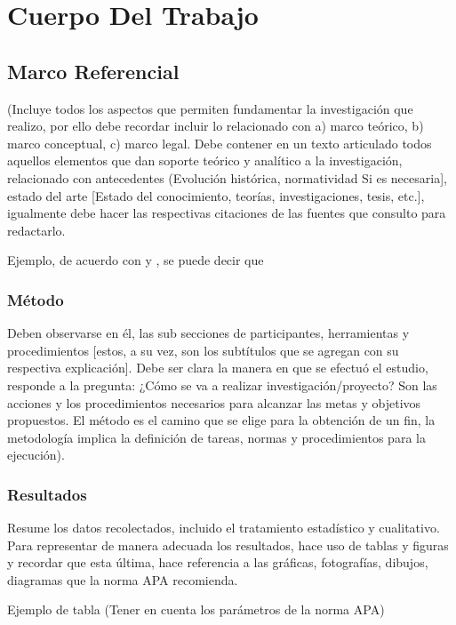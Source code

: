 \documentclass[11pt,openany]{book}
\begin{document}
\chapter{Cuerpo Del Trabajo}

\section{Marco Referencial}

(Incluye todos los aspectos que permiten fundamentar la investigación que realizo, por ello debe recordar incluir lo relacionado con a) marco teórico, b) marco conceptual, c) marco legal. Debe contener en un texto articulado todos aquellos elementos que dan soporte teórico y analítico a la investigación, relacionado con antecedentes (Evolución histórica, normatividad Si es necesaria], estado del arte [Estado del conocimiento, teorías, investigaciones, tesis, etc.], igualmente debe hacer las respectivas citaciones de las fuentes que consulto para redactarlo.

Ejemplo, de acuerdo con \parencite{Li2022} y \textcite{Vidas2021}, se puede decir que \lipsum[1]

\subsection{Método}

Deben observarse en él, las sub secciones de participantes, herramientas y procedimientos [estos, a su vez, son los subtítulos que se agregan con su respectiva explicación]. Debe ser clara la manera en que se efectuó el estudio, responde a la pregunta: ¿Cómo se va a realizar investigación/proyecto? Son las acciones y los procedimientos necesarios para alcanzar las metas y objetivos propuestos. El método es el camino que se elige para la obtención de un fin, la metodología implica la definición de tareas, normas y procedimientos para la ejecución).

\subsection{Resultados}

Resume los datos recolectados, incluido el tratamiento estadístico y cualitativo. Para representar de manera adecuada los resultados, hace uso de tablas y figuras y recordar que esta última, hace referencia a las gráficas, fotografías, dibujos, diagramas que la norma APA recomienda.

Ejemplo de tabla (Tener en cuenta los parámetros de la norma APA)
\end{document}
